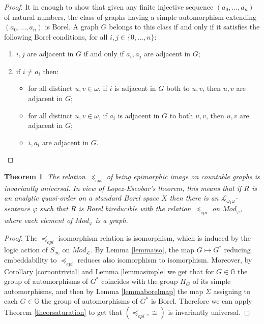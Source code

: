\documentclass{amsart}
\newtheorem{theorem}{Theorem}[section]
\theoremstyle{definition}
\theoremstyle{remark}
\begin{document}
\begin{proof}
It in enough to show that given any finite injective sequence
$(a_0,\dotsc ,a_n)$ of natural numbers, the class of graphs having
a simple automorphism extending $(a_0,\dotsc ,a_n)$ is Borel.
A graph $G$ belongs to this class if and only if it satisfies the following Borel
conditions, for all $i,j \in \{ 0,\dotsc ,n\} $:
\begin{enumerate}
\item $i,j$ are adjacent in $G$ if and only if $a_i,a_j$ are adjacent in $G$;
\item if $i \neq a_i$ then:
\begin{itemize}
\item for all distinct $u,v\in\omega $, if $i$ is adjacent in $G$ both
  to $u,v$, then $u,v$ are adjacent in $G$;
\item for all distinct $u,v\in\omega $, if $a_i$ is adjacent in $G$ to
  both $u,v$, then $u,v$ are adjacent in $G$;
\item $i,a_i$ are adjacent in $G$. \qedhere
\end{itemize}
\end{enumerate}
\end{proof}

\begin{theorem}
The relation $\preceq_{epi}$ of being epimorphic image on countable
graphs is invariantly universal. In view of Lopez-Escobar's theorem, this means that if $R$ is an analytic quasi-order on a
standard Borel space $X$ then
 there is an ${\mathcal{L}}_{\omega_1\omega}$-sentence ${\varphi}$
   such that $R$ is
Borel bireducible with the relation $\preceq_{epi}$ on $Mod_{\varphi}$, where
each element of $Mod_{\varphi}$ is a graph.
\end{theorem}

\begin{proof}
The $\preceq_{epi}$-isomorphism relation is
isomorphism, which is induced by the logic action of
$S_\infty$ on $Mod_{\mathcal{L}}$. By Lemma \ref{lemmaiso}, the map $G \mapsto
G^*$ reducing embeddability to $\preceq_{epi}$ reduces also isomorphism
to isomorphism. Moreover, by Corollary \ref{cornontrivial} and Lemma
\ref{lemmasimple} we get that for   $G \in {\mathbb{G}}$ the group
of automorphisms of $G^*$ coincides with the group $H_G$ of its
simple automorphisms, and then by Lemma \ref{lemmaborelmap} the map
$\Sigma$ assigning to each $G \in {\mathbb{G}}$ the group of automorphisms of $G^*$ is
Borel. Therefore we can apply Theorem \ref{theorsaturation} to get
that $(\preceq_{epi}, \cong)$ is invariantly universal.
\end{proof}
\end{document}
